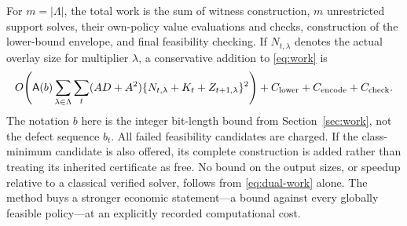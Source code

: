 For $m=|\Lambda|$, the total work is the sum of witness construction, $m$ unrestricted support solves, their own-policy value evaluations and checks, construction of the lower-bound envelope, and final feasibility checking. If $N_{t,\lambda}$ denotes the actual overlay size for multiplier $\lambda$, a conservative addition to \eqref{eq:work} is
\begin{equation}\label{eq:dual-work}
 O\!\left(\mathsf A(b)\sum_{\lambda\in\Lambda}\sum_t
 (AD+A^2)\{N_{t,\lambda}+K_t+Z_{t+1,\lambda}\}^2\right)
 +C_{\rm lower}+C_{\rm encode}+C_{\rm check}.
\end{equation}
The notation $b$ here is the integer bit-length bound from Section~\ref{sec:work}, not the defect sequence $b_t$. All failed feasibility candidates are charged. If the class-minimum candidate is also offered, its complete construction is added rather than treating its inherited certificate as free. No bound on the output sizes, or speedup relative to a classical verified solver, follows from \eqref{eq:dual-work} alone. The method buys a stronger economic statement---a bound against every globally feasible policy---at an explicitly recorded computational cost.
